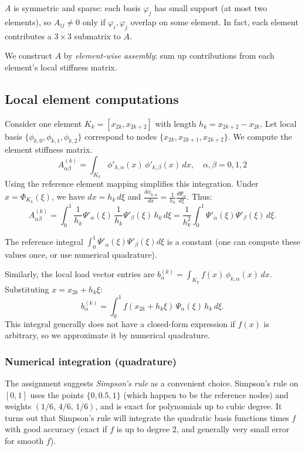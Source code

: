 \documentclass[a4paper,10pt]{article}
\begin{document}
\(A\) is symmetric and sparse: each basis \(\varphi_j\) has small support (at most two elements), so \(A_{ij}\neq 0\) only if \(\varphi_i, \varphi_j\) overlap on some element. 
In fact, each element contributes a \(3\times 3\) submatrix to \(A\).

We construct \(A\) by \emph{element-wise assembly}: sum up contributions from each element's local stiffness matrix.

\subsection*{Local element computations}
Consider one element \(K_k = [x_{2k}, x_{2k+2}]\) with length \(h_k = x_{2k+2}-x_{2k}\).
Let local basis \(\{\phi_{k,0},\phi_{k,1},\phi_{k,2}\}\) correspond to nodes \(\{x_{2k}, x_{2k+1}, x_{2k+2}\}\).
We compute the element stiffness matrix.
\[
A^{(k)}_{\alpha\beta} = \int_{K_k} \phi'_{k,\alpha}(x)\,\phi'_{k,\beta}(x)\,dx, \quad \alpha,\beta=0,1,2
\]
Using the reference element mapping simplifies this integration.
Under \(x = \Phi_{K_k}(\xi)\), we have \(dx = h_k\,d\xi\) and \(\frac{d\phi_{k,\alpha}}{dx} = \frac{1}{h_k}\frac{d\Psi_\alpha}{d\xi}\).
Thus:
\[
A^{(k)}_{\alpha\beta} 
= \int_{0}^{1} \frac{1}{h_k}\Psi'_{\alpha}(\xi)\,\frac{1}{h_k}\Psi'_{\beta}(\xi) \,h_k\,d\xi 
= \frac{1}{h_k^2}\int_{0}^{1} \Psi'_{\alpha}(\xi)\Psi'_{\beta}(\xi)\,d\xi.
\]

The reference integral \(\int_0^1 \Psi'_{\alpha}(\xi)\Psi'_{\beta}(\xi)d\xi\) is a constant (one can compute these values once, or use numerical quadrature).

Similarly, the local load vector entries are \(b^{(k)}_{\alpha} = \int_{K_k} f(x)\,\phi_{k,\alpha}(x)\,dx\).
Substituting \(x = x_{2k}+h_k\xi\):
\[b^{(k)}_{\alpha} = \int_{0}^{1} f(x_{2k}+h_k\xi)\,\Psi_{\alpha}(\xi)\,h_k\,d\xi.\]
This integral generally does not have a closed-form expression if \(f(x)\) is arbitrary, so we approximate it by numerical quadrature.

\subsubsection*{Numerical integration (quadrature)}
The assignment suggests \emph{Simpson's rule} as a convenient choice.
Simpson's rule on \([0,1]\) uses the points \(\{0, 0.5, 1\}\) (which happen to be the reference nodes) and weights \((1/6,\,4/6,\,1/6)\), and is exact for polynomials up to cubic degree. 
It turns out that Simpson's rule will integrate the quadratic basis functions times \(f\) with good accuracy (exact if \(f\) is up to degree 2, and generally very small error for smooth \(f\)). 
\end{document}
